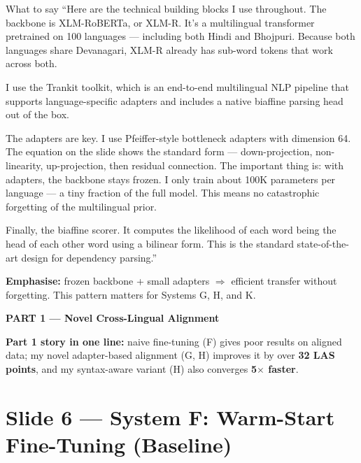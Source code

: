 \documentclass[11pt]{article}
\begin{document}
\begin{pitchbox}{What to say}
``Here are the technical building blocks I use throughout. The backbone is XLM-RoBERTa, or XLM-R. It's a multilingual transformer pretrained on 100 languages --- including both Hindi and Bhojpuri. Because both languages share Devanagari, XLM-R already has sub-word tokens that work across both.

I use the Trankit toolkit, which is an end-to-end multilingual NLP pipeline that supports language-specific adapters and includes a native biaffine parsing head out of the box.

The adapters are key. I use Pfeiffer-style bottleneck adapters with dimension 64. The equation on the slide shows the standard form --- down-projection, non-linearity, up-projection, then residual connection. The important thing is: with adapters, the backbone stays frozen. I only train about 100K parameters per language --- a tiny fraction of the full model. This means no catastrophic forgetting of the multilingual prior.

Finally, the biaffine scorer. It computes the likelihood of each word being the head of each other word using a bilinear form. This is the standard state-of-the-art design for dependency parsing.''
\end{pitchbox}

\begin{tipbox}
\textbf{Emphasise:} frozen backbone + small adapters $\Rightarrow$ efficient transfer without forgetting. This pattern matters for Systems G, H, and K.
\end{tipbox}

\clearpage

\begin{center}
{\LARGE\bfseries\color{part1color}PART 1 --- Novel Cross-Lingual Alignment}
\end{center}

\vspace{0.3cm}
\begin{tcolorbox}[colback=part1color!5,colframe=part1color,boxrule=0.5pt]
\textbf{Part 1 story in one line:} naive fine-tuning (F) gives poor results on aligned data; my novel adapter-based alignment (G, H) improves it by over \textbf{32 LAS points}, and my syntax-aware variant (H) also converges \textbf{5$\times$ faster}.
\end{tcolorbox}

\section{Slide 6 --- System F: Warm-Start Fine-Tuning (Baseline)}
\end{document}
